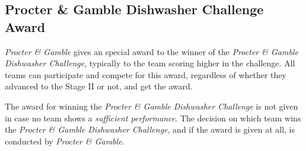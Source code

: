 \subsection{Procter \& Gamble Dishwasher Challenge Award}
\label{award:skill}
\textit{Procter \& Gamble} gives an special award to the winner of the \textit{Procter \& Gamble Dishwasher Challenge}, typically to the team scoring higher in the challenge.
All teams can participate and compete for this award, regardless of whether they advanced to the Stage II or not, and get the award.

The award for winning the \textit{Procter \& Gamble Dishwasher Challenge} is not given in case no team shows a \emph{sufficient performance}. The decision on which team wins the \textit{Procter \& Gamble Dishwasher Challenge}, and if the award is given at all, is conducted by \textit{Procter \& Gamble}.
